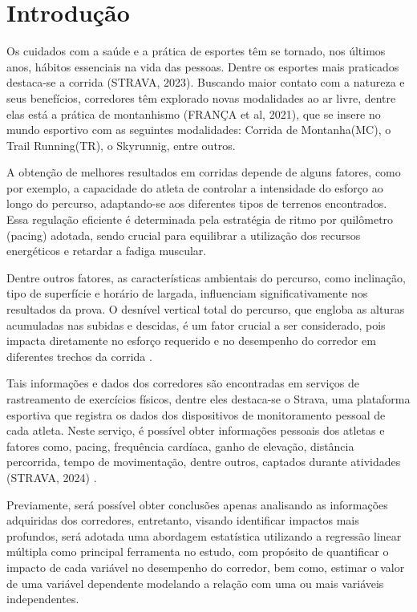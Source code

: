 
\section{Introdução}

Os cuidados com a saúde e a prática de esportes têm se tornado, nos últimos anos, hábitos essenciais na vida das pessoas. Dentre os esportes mais praticados destaca-se a corrida (STRAVA, 2023)\cite{strava_pesquisa}. Buscando maior contato com a natureza e seus benefícios, corredores têm explorado novas modalidades ao ar livre, dentre elas está a prática de montanhismo (FRANÇA et al, 2021)\cite{francagl}, que se insere no mundo esportivo com as seguintes modalidades: Corrida de Montanha(MC), o Trail Running(TR), o Skyrunnig, entre outros. 

A obtenção de melhores resultados em corridas depende de alguns fatores, como por exemplo, a capacidade do atleta de controlar a intensidade do esforço ao longo do percurso, adaptando-se aos diferentes tipos de terrenos encontrados. Essa regulação eficiente é determinada pela estratégia de ritmo por quilômetro (pacing) adotada, sendo crucial para equilibrar a utilização dos recursos energéticos e retardar a fadiga muscular. 

Dentre outros fatores, as características ambientais do percurso, como inclinação, tipo de superfície e horário de largada, influenciam significativamente nos resultados da prova. O desnível vertical total do percurso, que engloba as alturas acumuladas nas subidas e descidas, é um fator crucial a ser considerado, pois impacta diretamente no esforço requerido e no desempenho do corredor em diferentes trechos da corrida \cite{borgesdl}.

Tais informações e dados dos corredores são encontradas em serviços de rastreamento de exercícios físicos, dentre eles destaca-se o Strava, uma plataforma esportiva que registra os dados dos dispositivos de monitoramento pessoal de cada atleta. Neste serviço, é possível obter informações pessoais dos atletas e fatores como, pacing, frequência cardíaca, ganho de elevação, distância percorrida, tempo de movimentação, dentre outros, captados durante atividades (STRAVA, 2024) \cite{strava_info}.

Previamente, será possível obter conclusões apenas analisando as informações adquiridas dos corredores, entretanto, visando identificar impactos mais profundos, será adotada uma abordagem estatística utilizando a regressão linear múltipla como principal ferramenta no estudo, com propósito de quantificar o impacto de cada variável no desempenho do corredor, bem como, estimar o valor de uma variável dependente modelando a relação com uma ou mais variáveis independentes\cite{hoffmann}.

